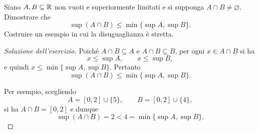 \begin{exercise}
\label{ex:fondamenti-sup-intersezione}
Siano $A,B\subseteq\mathbb{R}$ non vuoti e superiormente limitati
e si supponga $A\cap B\ne\varnothing$. Dimostrare che
\[
  \sup(A\cap B)\le\min\{\sup A,\sup B\}.
\]
Costruire un esempio in cui la disuguaglianza è stretta.
\end{exercise}
\begin{proof}[Soluzione dell'esercizio]
Poiché $A\cap B\subseteq A$ e $A\cap B\subseteq B$,
per ogni $x\in A\cap B$ si ha
\[
  x\le\sup A,\qquad x\le\sup B,
\]
e quindi $x\le\min\{\sup A,\sup B\}$. Pertanto
\[
  \sup(A\cap B)\le\min\{\sup A,\sup B\}.
\]

Per esempio, scegliendo
\[
  A=[0,2]\cup\{5\},\qquad B=[0,2]\cup\{4\},
\]
si ha $A\cap B=[0,2]$ e dunque
\[
  \sup(A\cap B)=2<4=\min\{\sup A,\sup B\}.
\]
\end{proof}
